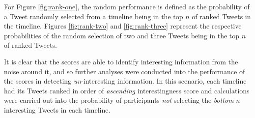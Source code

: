 For Figure \ref{fig:rank-one}, the random performance is defined as the probability of a Tweet randomly selected from a timeline being in the top $n$ of ranked Tweets in the timeline. Figures \ref{fig:rank-two} and \ref{fig:rank-three} represent the respective probabilities of the random selection of two and three Tweets being in the top $n$ of ranked Tweets.

It is clear that the scores are able to identify interesting information from the noise around it, and so further analyses were conducted into the performance of the scores in detecting \textit{un}-interesting information. In this scenario, each timeline had its Tweets ranked in order of \textit{ascending} interestingness score and calculations were carried out into the probability of participants \textit{not} selecting the \textit{bottom} $n$ interesting Tweets in each timeline.

